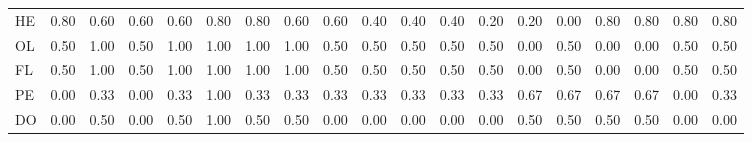 \begin{table}[!h]
{\begin{tabular}[t]{lrrrrrrrrrrrrrrrrrr}
HE & 0.80 & 0.60 & 0.60 & 0.60 & 0.80 & 0.80 & 0.60 & 0.60 & 0.40 & 0.40 & 0.40 & 0.20 & 0.20 & 0.00 & 0.80 & 0.80 & 0.80 & 0.80\\
OL & 0.50 & 1.00 & 0.50 & 1.00 & 1.00 & 1.00 & 1.00 & 0.50 & 0.50 & 0.50 & 0.50 & 0.50 & 0.00 & 0.50 & 0.00 & 0.00 & 0.50 & 0.50\\
\addlinespace
FL & 0.50 & 1.00 & 0.50 & 1.00 & 1.00 & 1.00 & 1.00 & 0.50 & 0.50 & 0.50 & 0.50 & 0.50 & 0.00 & 0.50 & 0.00 & 0.00 & 0.50 & 0.50\\
PE & 0.00 & 0.33 & 0.00 & 0.33 & 1.00 & 0.33 & 0.33 & 0.33 & 0.33 & 0.33 & 0.33 & 0.33 & 0.67 & 0.67 & 0.67 & 0.67 & 0.00 & 0.33\\
DO & 0.00 & 0.50 & 0.00 & 0.50 & 1.00 & 0.50 & 0.50 & 0.00 & 0.00 & 0.00 & 0.00 & 0.00 & 0.50 & 0.50 & 0.50 & 0.50 & 0.00 & 0.00\\
\bottomrule
\end{tabular}}
\end{table}
